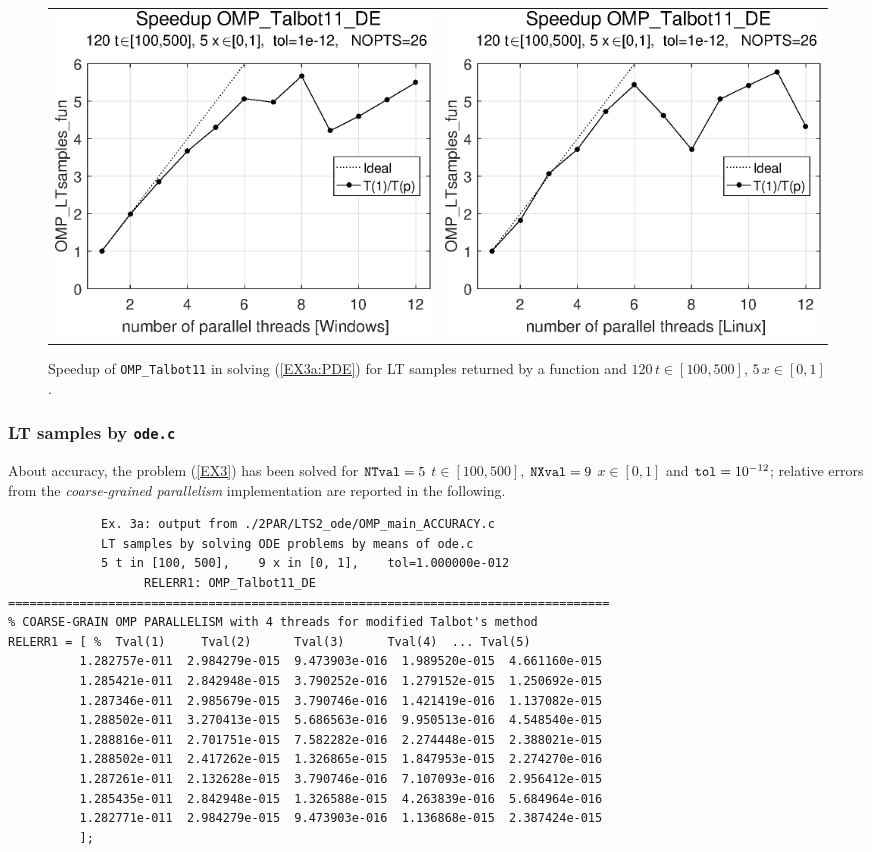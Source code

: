 \documentclass[a4paper,10pt]{report}%
\begin{document}
\begin{figure}[htb]
\centering
\begin{tabular}{cc} %
\includegraphics[height=0.2\textwidth]{./FIGS/EX3a/EX3a_fun_speedup_11_Windows.eps} &
\includegraphics[height=0.2\textwidth]{./FIGS/EX3a/EX3a_fun_speedup_11_Linux.eps}
\end{tabular}
\caption{\small Speedup of {\tt OMP\_Talbot11} in solving (\ref{EX3a:PDE}) for LT samples returned by a
function and $120\,t\in[100,500]$, $5\,x\in[0,1]$.}
\label{PAR_EX3a_speedup_fun}
\end{figure}



\subsubsection{LT samples by {\tt ode.c}}
About accuracy, the problem (\ref{EX3}) has been solved for ${\tt NTval}=5$ $t\in[100, 500]$, ${\tt NXval}=9$
$x\in[0,1]$ and ${\tt tol}=10^{-12}$; relative errors from the {\em coarse-grained parallelism} implementation
are reported in the following.
\begin{lstlisting}
             Ex. 3a: output from ./2PAR/LTS2_ode/OMP_main_ACCURACY.c
             LT samples by solving ODE problems by means of ode.c
             5 t in [100, 500],    9 x in [0, 1],    tol=1.000000e-012
                   RELERR1: OMP_Talbot11_DE
====================================================================================
% COARSE-GRAIN OMP PARALLELISM with 4 threads for modified Talbot's method
RELERR1 = [ %  Tval(1)     Tval(2)      Tval(3)      Tval(4)  ... Tval(5)
          1.282757e-011  2.984279e-015  9.473903e-016  1.989520e-015  4.661160e-015
          1.285421e-011  2.842948e-015  3.790252e-016  1.279152e-015  1.250692e-015
          1.287346e-011  2.985679e-015  3.790746e-016  1.421419e-016  1.137082e-015
          1.288502e-011  3.270413e-015  5.686563e-016  9.950513e-016  4.548540e-015
          1.288816e-011  2.701751e-015  7.582282e-016  2.274448e-015  2.388021e-015
          1.288502e-011  2.417262e-015  1.326865e-015  1.847953e-015  2.274270e-016
          1.287261e-011  2.132628e-015  3.790746e-016  7.107093e-016  2.956412e-015
          1.285435e-011  2.842948e-015  1.326588e-015  4.263839e-016  5.684964e-016
          1.282771e-011  2.984279e-015  9.473903e-016  1.136868e-015  2.387424e-015
          ];
\end{lstlisting}
\end{document}
